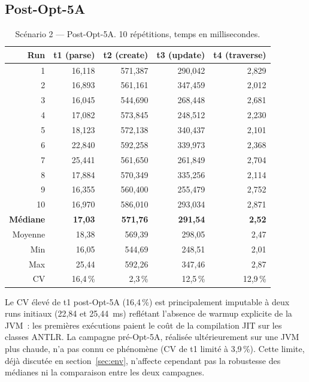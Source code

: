 \subsection*{Post-Opt-5A}

\begin{table}[h]
\centering
\caption{Scénario 2 --- Post-Opt-5A. 10 répétitions, temps en
millisecondes.}
\begin{tabular}{rrrrr}
\hline
\textbf{Run} & \textbf{t1 (parse)} & \textbf{t2 (create)} &
\textbf{t3 (update)} & \textbf{t4 (traverse)} \\
\hline
1  & 16,118 & 571,387 & 290,042 & 2,829 \\
2  & 16,893 & 561,161 & 347,459 & 2,012 \\
3  & 16,045 & 544,690 & 268,448 & 2,681 \\
4  & 17,082 & 573,845 & 248,512 & 2,230 \\
5  & 18,123 & 572,138 & 340,437 & 2,101 \\
6  & 22,840 & 592,258 & 339,973 & 2,368 \\
7  & 25,441 & 561,650 & 261,849 & 2,704 \\
8  & 17,884 & 570,349 & 335,256 & 2,114 \\
9  & 16,355 & 560,400 & 255,479 & 2,752 \\
10 & 16,970 & 586,010 & 293,034 & 2,871 \\
\hline
\textbf{Médiane}  & \textbf{17,03}  & \textbf{571,76} & \textbf{291,54} & \textbf{2,52} \\
Moyenne           & 18,38           & 569,39          & 298,05          & 2,47 \\
Min               & 16,05           & 544,69          & 248,51          & 2,01 \\
Max               & 25,44           & 592,26          & 347,46          & 2,87 \\
CV                & 16,4\,\%        & 2,3\,\%         & 12,5\,\%        & 12,9\,\% \\
\hline
\end{tabular}
\end{table}

Le CV élevé de t1 post-Opt-5A (16,4\,\%) est principalement imputable
à deux runs initiaux (22,84 et 25,44~ms) reflétant l'absence de warmup
explicite de la JVM~: les premières exécutions paient le coût de la
compilation JIT sur les classes ANTLR. La campagne pré-Opt-5A, réalisée
ultérieurement sur une JVM plus chaude, n'a pas connu ce phénomène
(CV de t1 limité à 3,9\,\%). Cette limite, déjà discutée en
section~\ref{sec:env}, n'affecte cependant pas la robustesse des
médianes ni la comparaison entre les deux campagnes.


